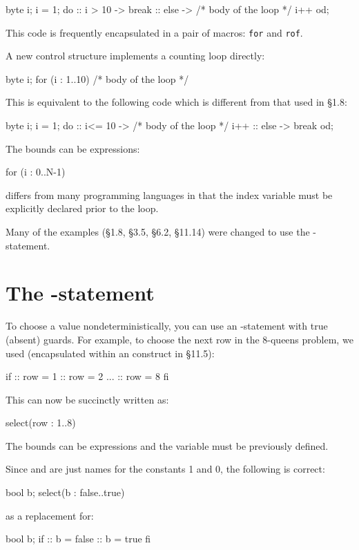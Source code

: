 \documentclass[11pt]{article}
\begin{document}
\begin{frag}
  byte i; 
  i = 1; 
  do 
  :: i > 10 -> break 
  :: else  ->
       /* body of the loop */
       i++
  od;
\end{frag}
This code is frequently encapsulated in a pair of macros: \texttt{for}
and \texttt{rof}.

A new control structure implements a counting loop directly:  
\begin{frag}
  byte i; 
  for (i : 1..10) {
    /* body of the loop */
  }
\end{frag}

This is equivalent to the following code which is different from that
used in \S{}1.8:

\newpage

\begin{frag}
  byte i; 
  i = 1; 
  do 
  :: i<= 10 ->
       /* body of the loop */
       i++
  :: else  -> break
  od;
\end{frag}


The bounds can be expressions:
\begin{frag}
  for (i : 0..N-1)
\end{frag}

\prm{} differs from many programming languages in that the index
variable must be explicitly declared prior to the loop. 

Many of the examples (\S{}1.8, \S{}3.5, \S{}6.2, \S{}11.14)
were changed to use the -statement.

\section{The -statement}

To choose a value nondeterministically, you can use an -statement
with true (absent) guards. For example, to choose the next row in the
8-queens problem, we used (encapsulated within an  construct
 in \S{}11.5):

\begin{frag}
	if
	:: row = 1
	:: row = 2
	   ...
	:: row = 8
	fi
\end{frag}

This can now be succinctly written as:
\begin{frag}
  select(row : 1..8)
\end{frag}
The bounds can be expressions and the variable must be previously defined.

Since  and  are just names for the constants 1 and 0,
the following is correct:
\begin{frag}
  bool b;
  select(b : false..true)
\end{frag}
as a replacement for:
\begin{frag}
  bool b;
  if :: b = false :: b = true fi
\end{frag}
\end{document}

